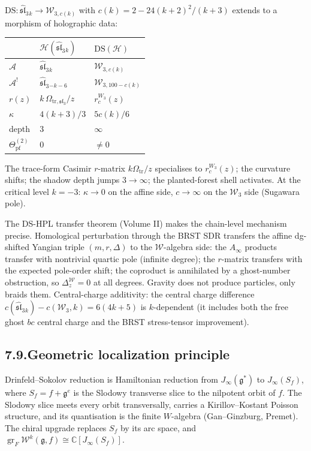 \documentclass[11pt,reqno]{amsart}
\theoremstyle{definition}
\theoremstyle{remark}
\providecommand{\cA}{\mathcal{A}}
\providecommand{\cH}{\mathcal{H}}
\providecommand{\cW}{\mathcal{W}}
\providecommand{\fg}{\mathfrak{g}}
\providecommand{\bC}{\mathbb{C}}
\providecommand{\fsl}{\mathfrak{sl}}
\DeclareMathOperator{\gr}{gr}
\numberwithin{equation}{section}
\begin{document}
$\mathrm{DS}\colon \widehat{\mathfrak{sl}}_3{}_k \to \cW_{3,c(k)}$
with $c(k) = 2 - 24(k+2)^2/(k+3)$ extends to a morphism of
holographic data:
\begin{center}
\renewcommand{\arraystretch}{1.15}
\begin{tabular}{lll}
& $\cH(\widehat{\mathfrak{sl}}_3{}_k)$
 & $\mathrm{DS}(\cH)$\\
\hline
$\cA$ & $\widehat{\mathfrak{sl}}_3{}_k$ & $\cW_{3,c(k)}$\\
$\cA^!$ & $\widehat{\mathfrak{sl}}_3{}_{-k-6}$ & $\cW_{3,100-c(k)}$\\
$r(z)$ & $k\,\Omega_{\mathrm{tr},\mathfrak{sl}_3}/z$ & $r_c^{W_3}(z)$\\
$\kappa$ & $4(k+3)/3$ & $5c(k)/6$\\
depth & $3$ & $\infty$\\
$\Theta^{(2)}_{\mathrm{pf}}$ & $0$ & $\neq 0$
\end{tabular}
\end{center}
The trace-form Casimir $r$-matrix
$k\Omega_{\mathrm{tr}}/z$ specialises to
$r_c^{W_3}(z)$; the curvature shifts; the shadow depth jumps
$3 \to \infty$; the planted-forest shell activates. At the
critical level $k = -3$: $\kappa \to 0$ on the affine side,
$c \to \infty$ on the $\cW_3$ side (Sugawara pole).

The DS-HPL transfer theorem (Volume II) makes the chain-level
mechanism precise. Homological perturbation through the BRST
SDR transfers the affine dg-shifted Yangian triple
$(m, r, \Delta)$ to the $\cW$-algebra side: the $A_\infty$
products transfer with nontrivial quartic pole (infinite
degree); the $r$-matrix transfers with the expected pole-order
shift; the coproduct is annihilated by a ghost-number
obstruction, so $\Delta_z^\cW = 0$ at all degrees. Gravity
does not produce particles, only braids them. Central-charge
additivity: the central charge difference
$c(\widehat{\fsl}_3{}_k) - c(\cW_3, k) = 6(4k{+}5)$
is $k$-dependent (it includes both the free ghost $bc$ central charge
and the BRST stress-tensor improvement).

\subsection*{7.9.\quad Geometric localization principle}

Drinfeld--Sokolov reduction is Hamiltonian reduction from
$J_\infty(\fg^*)$ to $J_\infty(S_f)$, where $S_f = f + \fg^e$
is the Slodowy transverse slice to the nilpotent orbit of $f$.
The Slodowy slice meets every orbit transversally, carries a
Kirillov--Kostant Poisson structure, and its quantisation is
the finite $W$-algebra (Gan--Ginzburg, Premet). The chiral
upgrade replaces $S_f$ by its arc space, and
$\gr_F \cW^k(\fg, f) \cong \bC[J_\infty(S_f)]$.
\end{document}
